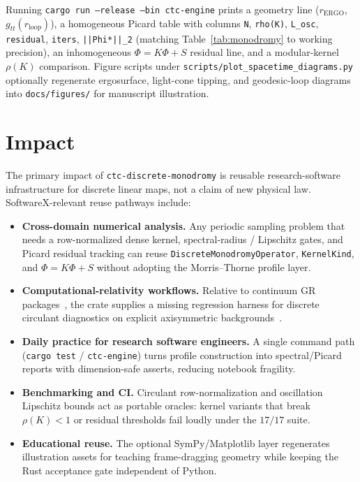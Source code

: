 \documentclass[preprint,12pt,a4paper]{elsarticle}
\begin{document}
Running \texttt{cargo run --release --bin ctc-engine} prints a geometry line ($r_{\mathrm{ERGO}}$, $g_{tt}(r_{\mathrm{loop}})$), a homogeneous Picard table with columns
\texttt{N}, \texttt{rho(K)}, \texttt{L\_osc}, \texttt{residual}, \texttt{iters}, \texttt{||Phi*||\_2} (matching Table~\ref{tab:monodromy} to working precision), an inhomogeneous $\Phi=K\Phi+S$ residual line, and a modular-kernel $\rho(K)$ comparison.
Figure scripts under \texttt{scripts/plot\_spacetime\_diagrams.py} optionally regenerate ergosurface, light-cone tipping, and geodesic-loop diagrams into \texttt{docs/figures/} for manuscript illustration.

\section{Impact}
\label{sec:impact}

The primary impact of \texttt{ctc-discrete-monodromy} is reusable research-software infrastructure for discrete linear maps, not a claim of new physical law.
SoftwareX-relevant reuse pathways include:

\begin{itemize}
  \item \textbf{Cross-domain numerical analysis.}
  Any periodic sampling problem that needs a row-normalized dense kernel, spectral-radius / Lipschitz gates, and Picard residual tracking can reuse \texttt{DiscreteMonodromyOperator}, \texttt{KernelKind}, and $\Phi=K\Phi+S$ without adopting the Morris--Thorne profile layer.
  \item \textbf{Computational-relativity workflows.}
  Relative to continuum GR packages~\cite{Bapat2019,SageManifolds,BaumgarteShapiro2010}, the crate supplies a missing regression harness for discrete circulant diagnostics on explicit axisymmetric backgrounds~\cite{PaniaguaRamirez2026CTC}.
  \item \textbf{Daily practice for research software engineers.}
  A single command path (\texttt{cargo test} / \texttt{ctc-engine}) turns profile construction into spectral/Picard reports with dimension-safe asserts, reducing notebook fragility.
  \item \textbf{Benchmarking and CI.}
  Circulant row-normalization and oscillation Lipschitz bounds act as portable oracles: kernel variants that break $\rho(K)<1$ or residual thresholds fail loudly under the $17/17$ suite.
  \item \textbf{Educational reuse.}
  The optional SymPy/Matplotlib layer regenerates illustration assets for teaching frame-dragging geometry while keeping the Rust acceptance gate independent of Python.
\end{itemize}
\end{document}
